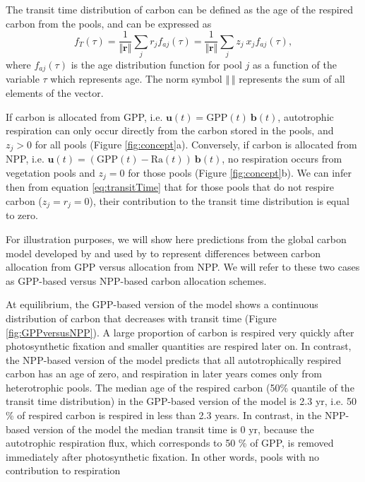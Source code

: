 \documentclass[12pt, a4paper]{article}
\begin{document}
The transit time distribution of carbon can be defined as the age of the respired carbon from the pools, and can be expressed as \citep{Metzler2018MG}
\begin{equation} \label{eq:transitTime}
f_T(\tau) = \frac{1}{\Vert \bm{r} \Vert} \sum_j r_j f_{aj}(\tau) =  \frac{1}{\Vert \bm{r} \Vert} \sum_j z_j \ x_j f_{aj}(\tau),
\end{equation}
where $f_{aj} (\tau)$ is the age distribution function for pool $j$ as a function of the variable $\tau$ which represents age. The norm symbol $\Vert \ \Vert$ represents the sum of all elements of the vector.


 If carbon is allocated from GPP, i.e. $\bm{u}(t) = \mathrm{GPP}(t) \ \bm{b}(t) $, autotrophic respiration can only occur directly from the carbon stored in the pools, and $z_j > 0$ for all pools (Figure \ref{fig:concept}a). Conversely, if carbon is allocated from NPP, i.e. $\bm{u}(t) = (\mathrm{GPP}(t) - \mathrm{Ra}(t)) \ \bm{b}(t)$, no respiration occurs from vegetation pools and $z_j = 0$ for those pools (Figure \ref{fig:concept}b). We can infer then from equation \eqref{eq:transitTime} that for those pools that do not respire carbon ($z_j = r_j = 0$), their contribution to the transit time distribution is equal to zero.

For illustration purposes, we will show here predictions from the global carbon model developed by \citet{Emanuel1981} and used by \citet{Thompson1999} to represent differences between carbon allocation from GPP versus allocation from NPP. We will refer to these two cases as GPP-based versus NPP-based carbon allocation schemes. 

At equilibrium, the GPP-based version of the model shows a continuous distribution of carbon that decreases with transit time (Figure \ref{fig:GPPversusNPP}). A large proportion of carbon is respired very quickly after photosynthetic fixation and smaller quantities are respired later on. In contrast, the NPP-based version of the model predicts that all autotrophically respired carbon has an age of zero, and respiration in later years comes only from heterotrophic pools. The median age of the respired carbon (50\% quantile of the transit time distribution) in the GPP-based version of the model is 2.3 yr, i.e. 50 \% of respired carbon is respired in less than 2.3 years. In contrast, in the NPP-based version of the model the median transit time is 0 yr, because the autotrophic respiration flux, which corresponds to 50 \% of GPP, is removed immediately after photosynthetic fixation. In other words, pools with no contribution to respiration
\end{document}
